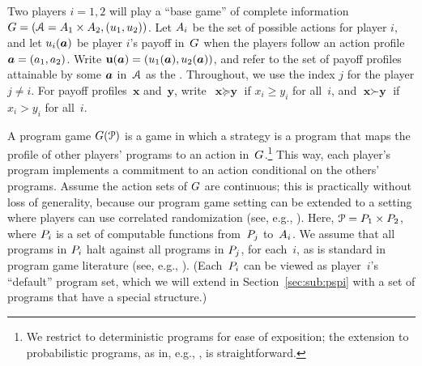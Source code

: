 \documentclass[sigconf]{aamas}
\theoremstyle{definition}
\begin{document}
Two players $i=1,2$ will play a ``base game'' 
of complete information $G = (\mathcal{A} = A_1 \times A_2, (u_1, u_2))$.
Let $A_i$
be the set
of possible actions for player $i$,
and let $u_i(\boldsymbol{a})$
be player $i$'s
payoff in~$G$
when the players
follow an action profile 
$\boldsymbol{a} = (a_1, a_2)$.
Write 
$\textbf{u}(\boldsymbol{a}) = (u_1(\boldsymbol{a}), u_2(\boldsymbol{a}))$, and refer to the 
set of payoff profiles attainable 
by some $\boldsymbol{a}$ in~$\mathcal{A}$ 
as the . 
Throughout, we use the index
$j$ for the player $j \neq i$.
For payoff profiles~$\textbf{x}$ and~$\textbf{y}$,
write~$\textbf{x} \succeq \textbf{y}$ if $x_i \geq y_i$ for all~$i$, and
$\textbf{x} \succ \textbf{y}$ if $x_i > y_i$ for all~$i$.

A program game $G(\mathcal{P})$ is a 
game in which a strategy
is a program that maps
the 
profile
of other players' programs
to an action in~$G$.\footnote{We restrict to deterministic
programs for ease of exposition; the extension 
to probabilistic
programs,
as in, e.g., \citet{kalai2010commitment}, is straightforward.}
This way, each player's program implements
a commitment
to an action
conditional on the others' programs.
Assume the action sets of $G$ are continuous; this is practically without loss of generality, because our program game setting can be
extended to a setting where players can use correlated randomization (see, e.g., \citet{kalai2010commitment}).
Here, $\mathcal{P} = P_1 \times P_2$,
where $P_i$ is a 
set of
computable functions
from~$P_j$
to~$A_i$.
We assume that all programs in $P_i$
halt against all programs in $ P_j$,
for each~$i$, as is standard in program game literature (see, e.g., \citet{tennenholtz2004program, oesterheld2019robust, oesterheld2021safe}).
(Each~$P_i$ can be viewed
as player~$i$'s ``default'' program
set,
which we will extend in
Section~\ref{sec:sub:pspi}
with a set of programs that
have a special structure.)
\end{document}
